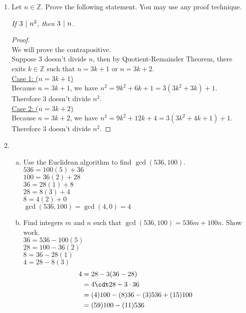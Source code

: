 \documentclass[12pt]{amsart}
\renewcommand*\divides{\hspace{0.05in}|\hspace{0.05in}}
\begin{document}
\begin{enumerate}[{\bfseries 1.}]
\vspace{0.2in}
\item Let $n\in\mathbb{Z}$.  Prove the following statement.  You may use any proof technique.

	\vspace{0.1in}
	\begin{center}
	\noindent
	\textit{\footnotemark[2]If $3\divides n^{2}$, then $3\divides n$.}
	\end{center}

	 \begin{proof}
	 \\We will prove the contrapositive.
	 \\Suppose $3$ doesn't divide $n$, then by Quotient-Remainder Theorem, there exits $k\in\mathbb{Z}$ such that $n = 3k+1$ or $n = 3k +2$.
	 \\\underline{Case 1: ($n = 3k+1$)}
	 \\Because $n = 3k +1$, we have $n^2 = 9k^2 + 6k +1 = 3(3k^2 + 3k) + 1$. Therefore 3 doesn't divide $n^2$.
	 \\\underline{Case 2: ($n = 3k+2$)}
	 \\Because $n = 3k +2$, we have $n^2 = 9k^2 + 12k +4 = 3(3k^2 + 4k+1) + 1$. Therefore 3 doesn't divide $n^2$.
	 
	 \end{proof}
	 \vfill
	 \vfill
	 \vfill
	 \vfill


\newpage
\item\begin{enumerate}[(a)]
	\vspace{0.1in}
	\item Use the Euclidean algorithm to find $\gcd{(536, 100)}$.
		\\$536 = 100(5) + 36$
		\\$100 = 36(2) + 28$
		\\$36 = 28(1) + 8$
		\\$28 = 8(3)+4$
		\\$8 = 4(2) + 0$
		\\$\gcd{(536, 100)} = \gcd{(4, 0)} = 4$
	\vspace{0.1in}
	\item Find integers $m$ and $n$ such that $\gcd{(536, 100)}=536m+100n$.  Show work.
		\\$36 = 536 - 100(5)$
		\\$28 = 100 - 36(2)$
		\\$8 = 36 - 28(1)$
		\\$4 = 28 - 8(3)$
		\begin{align*}
		4 &= 28 - 3(36 - 28) \\
		&= 4\cdt 28 - 3\cdot 36 \\
		&= (4)100 - (8)36-(3)536+(15)100 \\
		&= (59)100 - (11)536
		\end{align*}
	\end{enumerate}

\end{enumerate}
\end{document}
